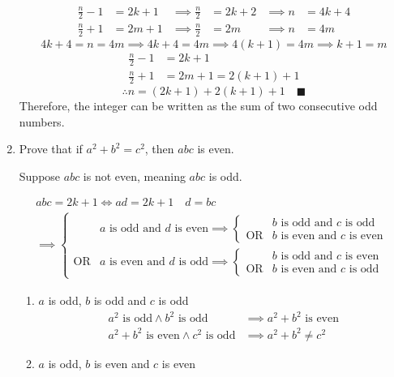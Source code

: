 \documentclass[letterpaper, 12pt]{article}
\newcommand{\qed}{\quad \blacksquare}
\begin{document}
\begin{enumerate}
\begin{align*}
    \frac{n}{2} - 1 &= 2k + 1 &\implies \frac{n}{2} &= 2k + 2 &\implies n &= 4k + 4 \\
    \frac{n}{2} + 1 &= 2m + 1 &\implies \frac{n}{2} &= 2m &\implies n &= 4m
\end{align*}
\[4k + 4 = n = 4m \implies 4k + 4 = 4m \implies 4(k + 1) = 4m \implies k + 1 = m\]
\begin{align*}
    \frac{n}{2} - 1 &= 2k + 1 \\
    \frac{n}{2} + 1 &= 2m + 1 = 2(k + 1) + 1
\end{align*}
\[\therefore n = (2k + 1) + 2(k + 1) + 1 \qed\]
Therefore, the integer can be written as the sum of two consecutive odd numbers.
\pagebreak
\item Prove that if $a^2 + b^2 = c^2$, then $abc$ is even.
\begin{flushleft}
    Suppose $abc$ is not even, meaning $abc$ is odd.
\end{flushleft}
\begin{gather*}
    abc = 2k + 1 \iff ad = 2k + 1 \quad d = bc \\
    \implies \begin{cases}
        & \text{$a$ is odd and $d$ is even} \implies \begin{cases}
            & \text{$b$ is odd and $c$ is odd} \\
            \text{OR} & \text{$b$ is even and $c$ is even}
        \end{cases} \\
        \text{OR} & \text{$a$ is even and $d$ is odd} \implies \begin{cases}
            & \text{$b$ is odd and $c$ is even} \\
            \text{OR} & \text{$b$ is even and $c$ is odd}
        \end{cases}
    \end{cases}
\end{gather*}
\begin{enumerate}
    \item $a$ is odd, $b$ is odd and $c$ is odd
    \begin{align*}
        a^2 \text{ is odd} \wedge b^2 \text{ is odd} &\implies a^2 + b^2 \text{ is even} \\
        a^2 + b^2 \text{ is even} \wedge c^2 \text{ is odd} &\implies a^2 + b^2 \ne c^2
    \end{align*}
    \item $a$ is odd, $b$ is even and $c$ is even

\end{enumerate}
\end{enumerate}
\end{document}
